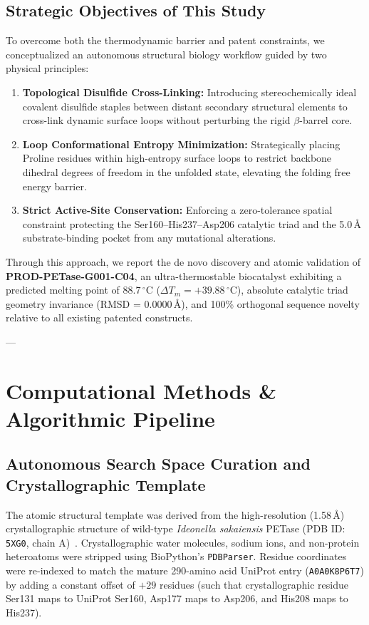 \documentclass[10pt,twocolumn,a4paper]{article}
\begin{document}
\subsection{Strategic Objectives of This Study}
To overcome both the thermodynamic barrier and patent constraints, we conceptualized an autonomous structural biology workflow guided by two physical principles:
\begin{enumerate}
    \item \textbf{Topological Disulfide Cross-Linking:} Introducing stereochemically ideal covalent disulfide staples between distant secondary structural elements to cross-link dynamic surface loops without perturbing the rigid $\beta$-barrel core.
    \item \textbf{Loop Conformational Entropy Minimization:} Strategically placing Proline residues within high-entropy surface loops to restrict backbone dihedral degrees of freedom in the unfolded state, elevating the folding free energy barrier.
    \item \textbf{Strict Active-Site Conservation:} Enforcing a zero-tolerance spatial constraint protecting the Ser160--His237--Asp206 catalytic triad and the 5.0\,\AA{} substrate-binding pocket from any mutational alterations.
\end{enumerate}

Through this approach, we report the de novo discovery and atomic validation of \textbf{PROD-PETase-G001-C04}, an ultra-thermostable biocatalyst exhibiting a predicted melting point of $88.7\,^\circ\text{C}$ ($\Delta T_m = +39.88\,^\circ\text{C}$), absolute catalytic triad geometry invariance (RMSD = 0.0000\,\AA{}), and 100\% orthogonal sequence novelty relative to all existing patented constructs.

---

\section{Computational Methods \& Algorithmic Pipeline}

\subsection{Autonomous Search Space Curation and Crystallographic Template}
The atomic structural template was derived from the high-resolution (1.58\,\AA{}) crystallographic structure of wild-type \textit{Ideonella sakaiensis} PETase (PDB ID: \texttt{5XG0}, chain A)~\cite{Han2017}. Crystallographic water molecules, sodium ions, and non-protein heteroatoms were stripped using BioPython's \texttt{PDBParser}. Residue coordinates were re-indexed to match the mature 290-amino acid UniProt entry (\texttt{A0A0K8P6T7}) by adding a constant offset of $+29$ residues (such that crystallographic residue Ser131 maps to UniProt Ser160, Asp177 maps to Asp206, and His208 maps to His237).
\end{document}
